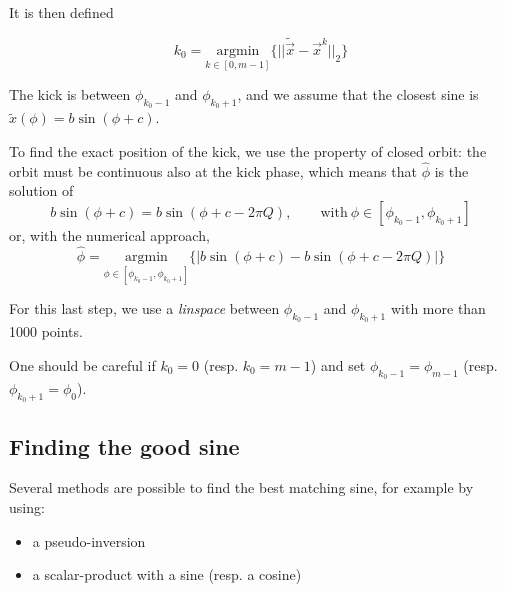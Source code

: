 It is then defined

\begin{equation}
k_0 = \underset{k \in [0, m-1]}{\textrm{argmin}}\{||\tilde{\vec{x}}-\vec{x}^k||_2\}
\end{equation}

The kick is between $\phi_{k_0-1}$ and $\phi_{k_0+1}$, and we assume that the closest sine is $\tilde{x}(\phi) = b \sin(\phi + c) $.

To find the exact position of the kick, we use the property of closed orbit: the orbit must be continuous also at the kick phase, which means that $\hat{\phi}$ is the solution of
\begin{equation}
b \sin(\phi + c) = b\sin(\phi+c-2 \pi Q), \qquad \mathrm{with}~ \phi \in [\phi_{k_0-1}, \phi_{k_0+1}]
\end{equation}
or, with the numerical approach, 
\begin{equation}
\hat{\phi} =  \underset{\phi \in [\phi_{k_0-1}, \phi_{k_0+1}]}{\textrm{argmin}}\{|b \sin(\phi + c) - b\sin(\phi+c-2 \pi Q)|\}
\end{equation}

\remark For this last step, we use a \textit{linspace} between $\phi_{k_0-1}$ and $\phi_{k_0+1}$ with more than 1000 points.

\remark One should be careful if $k_0 = 0$ (resp. $k_0 = m-1$) and set $\phi_{k_0-1} =\phi_{m-1}$ (resp. $\phi_{k_0+1} = \phi_{0}$). 

\subsection{Finding the good sine}
Several methods are possible to find the best matching sine, for example by using:
\begin{itemize}
	\item a pseudo-inversion
	\item a scalar-product with a sine (resp. a cosine)
\end{itemize}

